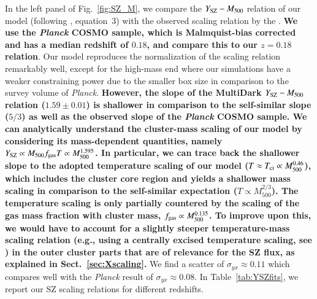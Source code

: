 \documentclass[useAMS,usenatbib]{mn2e}
\begin{document}
In the left panel of Fig.~\ref{fig:SZ_M}, we compare the $Y_{{\mathrm{SZ}}}-M_{500}$
relation of our model (following \citealp{2012ApJ...758...74B}, equation~3) with
the observed scaling relation by the \cite{2013arXiv1303.5080P}. {\bf We use the
  \emph{Planck} COSMO sample, which is Malmquist-bias corrected and has a median
  redshift of $0.18$, and compare this to our $z=0.18$ relation}. Our model
reproduces the normalization of the scaling relation remarkably well, except for
the high-mass end where our simulations have a weaker constraining power due to
the smaller box size in comparison to the survey volume of {\em Planck}.  {\bf
  However, the slope of the MultiDark $Y_{{\mathrm{SZ}}}-M_{500}$ relation ($1.59\pm0.01$) is
  shallower in comparison to the self-similar slope ($5/3$) as well as the
  observed slope of the \emph{Planck} COSMO sample. We can analytically
  understand the cluster-mass scaling of our model by considering its
  mass-dependent quantities, namely $Y_{{\mathrm{SZ}}}\propto M_{500} f_{{\mathrm{gas}}}
  T \propto M_{500}^{1.595}$. In particular, we can trace back the
  shallower slope to the adopted temperature scaling of our model
  ($T\approx T_{{\mathrm{ci}}}\propto M_{500}^{0.46}$), which includes the cluster core region
  and yields a shallower mass scaling in comparison to the self-similar
  expectation ($T\propto M_{500}^{2/3}$). The temperature scaling is only
  partially countered by the scaling of the gas mass fraction with cluster mass,
  $f_{{\mathrm{gas}}}\propto M_{500}^{0.135}$. To improve upon this, we would have to
  account for a slightly steeper temperature-mass scaling relation (e.g., using a
  centrally excised temperature scaling, see \citealt{2010MNRAS.406.1773M}) in
  the outer cluster parts that are of relevance for the SZ flux, as explained in
  Sect.~\ref{sec:Xscaling}. }  We find a scatter of $\sigma_{yx} \approx 0.11$
which compares well with the \emph{Planck} result of $\sigma_{yx} \approx
0.08$. In Table~\ref{tab:YSZfits}, we report our SZ scaling relations for
different redshifts.
\end{document}
